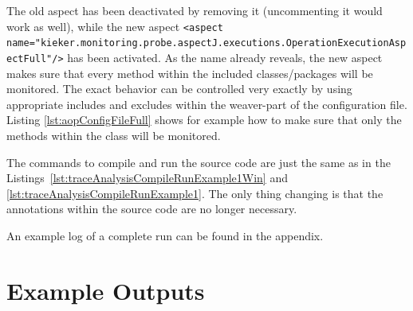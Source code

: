\setXMLListing


\noindent The old aspect has been deactivated by removing it (uncommenting it would work as well), while the new aspect \lstinline$<aspect name="kieker.monitoring.probe.aspectJ.executions.OperationExecutionAspectFull"/>$ has been activated. As the name already reveals, the new aspect makes sure that every method within the included classes/packages will be monitored. The exact behavior can be controlled very exactly by using appropriate includes and excludes within the weaver-part of the configuration file. Listing \ref{lst:aopConfigFileFull} shows for example how to make sure that only the methods within the class  will be monitored.

The commands to compile and run the source code are just the same as in the Listings~\ref{lst:traceAnalysisCompileRunExample1Win} and \ref{lst:traceAnalysisCompileRunExample1}. The only thing changing is that the annotations within the source code are no longer necessary.

An example log of a complete run can be found in the appendix.


\section{Example \KiekerTraceAnalysis{} Outputs}\label{sec:traceAnalysisExamples}
